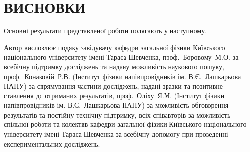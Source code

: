 \chapter*{\MakeUppercase{Висновки}}						%


Основні результати представленої роботи полягають у наступному.


Автор висловлює подяку
завідувачу кафедри загальної фізики Київського національного університету імені Тараса Шевченка,
проф.~Боровому~М.\:О. за всебічну підтримку досліджень та надану можливість наукового пошуку,
проф.~Конаковій~Р.\:В. (Інститут фізики напівпровідників ім. В.\:Є.~Лашкарьова НАНУ) за спрямування частини досліджень, надані зразки та позитивне ставлення до отриманих результатів,
проф.~Оліху~Я.\:М. (Інститут фізики напівпровідників ім. В.\:Є.~Лашкарьова НАНУ) за можливість обговорення результатів та постійну технічну підтримку,
всіх співавторів за можливість спільної роботи
та колектив кафедри загальної фізики Київського національного університету імені Тараса Шевченка за всебічну допомогу при проведенні експериментальних досліджень.

